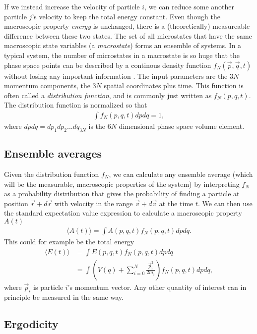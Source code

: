 If we instead increase the velocity of particle $i$, we can reduce some another particle $j$'s velocity to keep the total energy constant. Even though the macroscopic property \textit{energy} is unchanged, there is a (theoretically) measureable difference between these two states. The set of all microstates that have the same macroscopic state variables (a \textit{macrostate}) forms an ensemble of systems. In a typical system, the number of microstates in a macrostate is so huge that the phase space points can be described by a continous density function $f_N(\vec p, \vec q, t)$ without losing any important information \cite{mcquarrie1973statistical}. The input parameters are the $3N$ momentum components, the $3N$ spatial coordinates plus time. This function is often called a \textit{distribution function}, and is commonly just written as $f_N(p, q, t)$. The distribution function is normalized so that
\begin{align}
	\int f_N(p, q, t) dpdq = 1,
\end{align}
where $dpdq=dp_1dp_2...dq_{3N}$ is the $6N$ dimensional phase space volume element. 

\subsection{Ensemble averages}
Given the distribution function $f_N$, we can calculate any ensemble average (which will be the measurable, macroscopic properties of the system) by interpreting $f_N$ as a probability distribution that gives the probability of finding a particle at position $\vec r + d\vec r$ with velocity in the range $\vec v + d\vec v$ at the time $t$. We can then use the standard expectation value expression to calculate a macroscopic property $A(t)$
\begin{align}
	\langle A(t) \rangle = \int A(p, q, t)f_N(p, q, t)dpdq.
\end{align}
This could for example be the total energy
\begin{align}
	\langle E(t) \rangle &= \int E(p, q, t)f_N(p, q, t)dpdq \\
	&= \int \left(V(q) + \sum_{i=0}^N \frac{\vec p_i^2}{2m_i} \right)f_N(p, q, t)dpdq,
\end{align}
where $\vec p_i$ is particle $i$'s momentum vector. Any other quantity of interest can in principle be measured in the same way. 
\subsection{Ergodicity}

